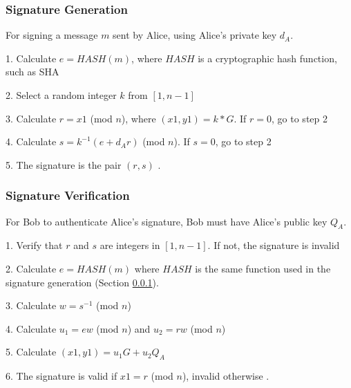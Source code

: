 \documentclass[12pt,a4paper]{article}
\begin{document}
\subsubsection{Signature Generation} \label{Signature Generation}
For signing a message $m$ sent by Alice, using Alice's private key $d_A$.

1. Calculate $e = HASH(m)$, where $HASH$ is a cryptographic hash function, such as SHA

2. Select a random integer $k$ from $[1,n-1]$

3. Calculate $r = x1$ (mod $n$), where $(x1,y1) = k * G$. If $r = 0$, go to step 2

4. Calculate $s = k^{-1}(e+d_Ar)$ (mod $n$). If $s = 0$, go to step 2

5. The signature is the pair $(r,s)$ \cite{hankerson2003guide,anoop2007elliptic,koblitz2000state,silverman2009arithmetic,jurivsic1997elliptic}.

\subsubsection{Signature Verification} \label{Signature Verification}
For Bob to authenticate Alice's signature, Bob must have Alice's public key $Q_A$.

1. Verify that $r$ and $s$ are integers in $[1,n-1]$. If not, the signature is invalid

2. Calculate $e =HASH(m)$ where $HASH$ is the same function used in the signature generation (Section \ref{Signature Generation}).

3. Calculate $w = s^{-1}$ (mod $n$)

4. Calculate $u_1 = ew$ (mod $n$) and $u_2 = rw$ (mod $n$)

5. Calculate $(x1,y1) = u_1G + u_2Q_A$

6. The signature is valid if $x1 = r$ (mod $n$), invalid otherwise \cite{hankerson2003guide,anoop2007elliptic,koblitz2000state,silverman2009arithmetic,jurivsic1997elliptic}.
\end{document}
